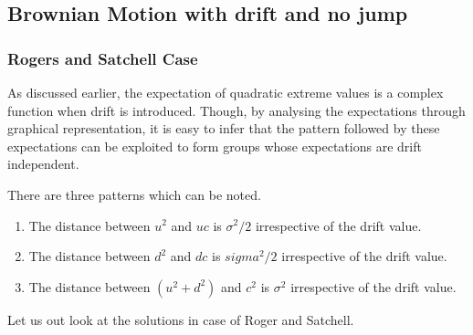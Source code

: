 \documentclass[12pt]{article}   	%
\begin{document}
\subsection{Brownian Motion with drift and no jump}
\subsubsection{Rogers and Satchell Case}
As discussed earlier, the expectation of quadratic extreme values is a complex function when drift is introduced. Though, by analysing the expectations through graphical representation, it is easy to infer that the pattern followed by these expectations can be exploited to form groups whose expectations are drift independent. 

There are three patterns which can be noted.
\begin{enumerate}
\item The distance between $u^2$ and $uc$ is $\sigma^2/2$ irrespective of the drift value.
\item The distance between $d^2$ and $dc$ is $sigma^2/2$ irrespective of the drift value.
\item The distance between $(u^2+ d^2)$ and $c^2$ is $\sigma^2$  irrespective of the drift value.
\end{enumerate}
Let us out look at the solutions in case of Roger and Satchell.
\end{document}
